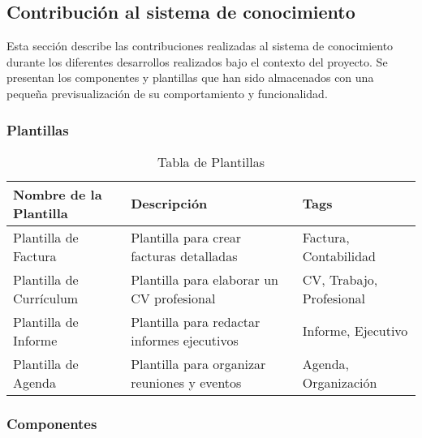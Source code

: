 \subsection{Contribución al sistema de conocimiento}
Esta sección describe las contribuciones realizadas al sistema de conocimiento
durante los diferentes desarrollos realizados bajo el contexto del proyecto. 
Se presentan los componentes y plantillas que han sido almacenados con 
una pequeña previsualización de su comportamiento y funcionalidad. 

\subsubsection{Plantillas}
\begin{table}[h!]
    \centering
    \begin{tabular}{| m{4cm} | m{7cm} | m{5cm} |}
      \hline
      \textbf{Nombre de la Plantilla} & \textbf{Descripción} & \textbf{Tags} \\ 
      \hline
      Plantilla de Factura & Plantilla para crear facturas detalladas & Factura, Contabilidad \\ 
      \hline
      Plantilla de Currículum & Plantilla para elaborar un CV profesional & CV, Trabajo, Profesional \\ 
      \hline
      Plantilla de Informe & Plantilla para redactar informes ejecutivos & Informe, Ejecutivo \\ 
      \hline
      Plantilla de Agenda & Plantilla para organizar reuniones y eventos & Agenda, Organización \\ 
      \hline
    \end{tabular}
    \caption{Tabla de Plantillas}
    \label{table:templates}    
\end{table}

\subsubsection{Componentes}
